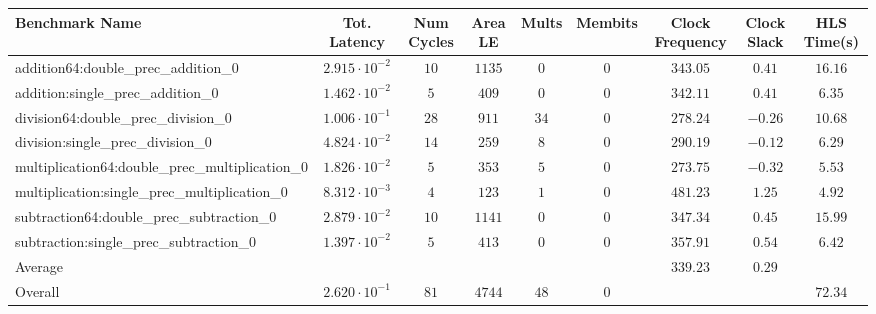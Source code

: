 \begin{tabular}{|l|c|c|c|c|c|c|c|c|}
\hline
Benchmark Name                                   & Tot. Latency            & Num Cycles & Area LE  & Mults  & Membits & Clock Frequency & Clock Slack & HLS Time(s) \\
\hline
addition64:double\_prec\_addition\_0             & $ 2.915 \cdot 10^{-2} $ & $ 10     $ & $ 1135 $ & $ 0  $ & $ 0   $ & $ 343.05      $ & $ 0.41    $ & $ 16.16   $ \\
addition:single\_prec\_addition\_0               & $ 1.462 \cdot 10^{-2} $ & $ 5      $ & $ 409  $ & $ 0  $ & $ 0   $ & $ 342.11      $ & $ 0.41    $ & $ 6.35    $ \\
division64:double\_prec\_division\_0             & $ 1.006 \cdot 10^{-1} $ & $ 28     $ & $ 911  $ & $ 34 $ & $ 0   $ & $ 278.24      $ & $ -0.26   $ & $ 10.68   $ \\
division:single\_prec\_division\_0               & $ 4.824 \cdot 10^{-2} $ & $ 14     $ & $ 259  $ & $ 8  $ & $ 0   $ & $ 290.19      $ & $ -0.12   $ & $ 6.29    $ \\
multiplication64:double\_prec\_multiplication\_0 & $ 1.826 \cdot 10^{-2} $ & $ 5      $ & $ 353  $ & $ 5  $ & $ 0   $ & $ 273.75      $ & $ -0.32   $ & $ 5.53    $ \\
multiplication:single\_prec\_multiplication\_0   & $ 8.312 \cdot 10^{-3} $ & $ 4      $ & $ 123  $ & $ 1  $ & $ 0   $ & $ 481.23      $ & $ 1.25    $ & $ 4.92    $ \\
subtraction64:double\_prec\_subtraction\_0       & $ 2.879 \cdot 10^{-2} $ & $ 10     $ & $ 1141 $ & $ 0  $ & $ 0   $ & $ 347.34      $ & $ 0.45    $ & $ 15.99   $ \\
subtraction:single\_prec\_subtraction\_0         & $ 1.397 \cdot 10^{-2} $ & $ 5      $ & $ 413  $ & $ 0  $ & $ 0   $ & $ 357.91      $ & $ 0.54    $ & $ 6.42    $ \\
\hline
Average                                          & $                     $ & $        $ & $      $ & $    $ & $     $ & $ 339.23      $ & $ 0.29    $ & $         $ \\
\hline
Overall                                          & $ 2.620 \cdot 10^{-1} $ & $ 81     $ & $ 4744 $ & $ 48 $ & $ 0   $ & $             $ & $         $ & $ 72.34   $ \\
\hline
\end{tabular}
